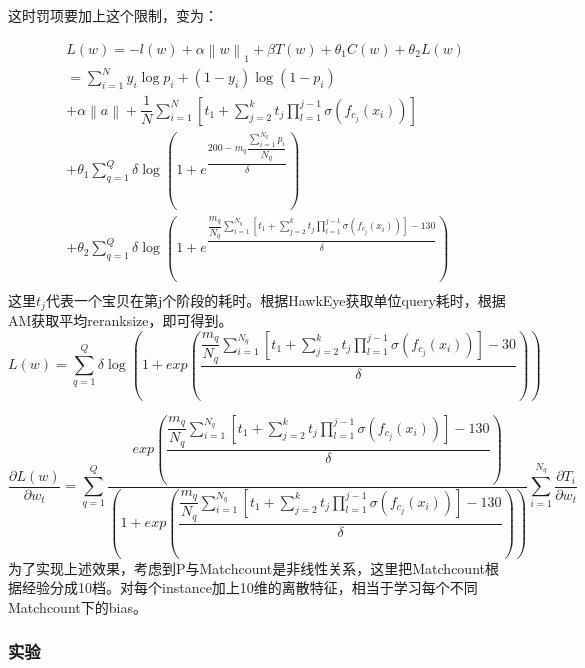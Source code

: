 这时罚项要加上这个限制，变为：

$$\begin{align}
&L(w)=-l(w)+\alpha\left\|w\right\|_1+{\beta}T(w)+{\theta}_1C(w)+{\theta}_2L(w)\nonumber\\
&=\sum_{i=1}^Ny_i\mathop{\log}p_i+(1-y_i)\mathop{\log}(1-p_i)\nonumber\\
&+\alpha\left\|a\right\|+\dfrac{1}{N}\sum_{i=1}^N[t_1+\sum_{j=2}^kt_j\prod\limits_{l=1}^{j-1}\sigma(f_{c_j}(x_i))]\nonumber\\
&+{\theta_1}\sum_{q=1}^{Q}{\delta}\mathop{\log}(1+e^{\dfrac{200-{m}_q{\dfrac{{\sum}_{i=1}^{N_q}p_i}{N_q}}}{\delta}})\nonumber\\
&+{\theta_2}\sum_{q=1}^{Q}{\delta}\mathop{\log}(1+e^{\dfrac{\dfrac{m_q}{N_q}{\sum_{i=1}^{N_q}[t_1+\sum_{j=2}^kt_j\prod\limits_{l=1}^{j-1}\sigma(f_{c_j}(x_i))]-130}}{\delta}})\nonumber\\
\end{align}
$$
这里$t_j$代表一个宝贝在第j个阶段的耗时。根据HawkEye获取单位query耗时，根据AM获取平均reranksize，即可得到。
$$L(w)=\sum_{q=1}^{Q}{\delta}\mathop{\log}(1+exp({\dfrac{\dfrac{m_q}{N_q}{\sum_{i=1}^{N_q}[t_1+\sum_{j=2}^kt_j\prod\limits_{l=1}^{j-1}\sigma(f_{c_j}(x_i))]-30}}{\delta}}))$$

$$\dfrac{{\partial}L(w)}{{\partial}w_t}=\sum_{q=1}^{Q}\dfrac{exp({\dfrac{\dfrac{m_q}{N_q}{\sum_{i=1}^{N_q}[t_1+\sum_{j=2}^kt_j\prod\limits_{l=1}^{j-1}\sigma(f_{c_j}(x_i))]-130}}{\delta}})}{(1+exp({\dfrac{\dfrac{m_q}{N_q}{\sum_{i=1}^{N_q}[t_1+\sum_{j=2}^kt_j\prod\limits_{l=1}^{j-1}\sigma(f_{c_j}(x_i))]-130}}{\delta}}))}\sum_{i=1}^{N_q}\dfrac{{\partial}T_i}{{\partial}w_t}$$
为了实现上述效果，考虑到P与Matchcount是非线性关系，这里把Matchcount根据经验分成10档。对每个instance加上10维的离散特征，相当于学习每个不同Matchcount下的bias。


\subsubsection{实验}

